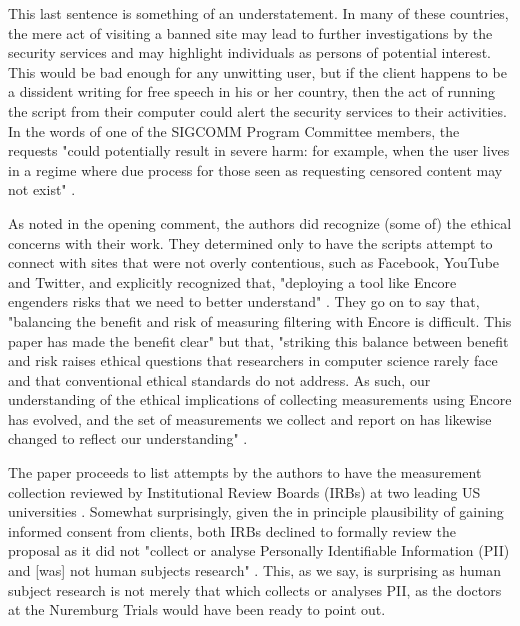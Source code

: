 \documentclass{svjour3}                     %
\begin{document}
This last sentence is something of an understatement.  In many of these countries, the mere act of visiting a banned site may lead to further investigations by the security services and may highlight individuals as persons of potential interest.  This would be bad enough for any unwitting user, but if the client happens to be a dissident writing for free speech in his or her country, then the act of running the script from their computer could alert the security services to their activities. In the words of one of the SIGCOMM Program Committee members, the requests "could potentially result in severe harm: for example, when the user lives in a regime where due process for those seen as requesting censored content may not exist" \cite{byers2015encore}.

As noted in the opening comment, the authors did recognize (some of) the ethical concerns with their work.  They determined only to have the scripts attempt to connect with sites that were not overly contentious, such as Facebook, YouTube and Twitter, and explicitly recognized that, "deploying a tool like Encore engenders risks that we need to better understand" \cite[p.~663] {burnett2015encore}. They go on to say that, "balancing the benefit and risk of measuring filtering with Encore is difficult. This paper has made the benefit clear" but that, "striking this balance between benefit and risk raises ethical questions that researchers in computer science rarely face and that conventional ethical standards do not address. As such, our understanding of the ethical implications of collecting measurements using Encore has evolved, and the set of measurements we collect and report on has likewise changed to reflect our understanding" \cite[p.~663] {burnett2015encore}.

The paper proceeds to list attempts by the authors to have the measurement collection reviewed by Institutional Review Boards (IRBs) at two leading US universities \cite[Table 2,~p.~662] {burnett2015encore}. Somewhat surprisingly, given the in principle plausibility of gaining informed consent from clients, both IRBs declined to formally review the proposal as it did not "collect or analyse Personally Identifiable Information (PII) and [was] not human subjects research" \cite[p.~664]{burnett2015encore}. This, as we say, is surprising as human subject research is not merely that which collects or analyses PII, as the doctors at the Nuremburg Trials would have been ready to point out.
\end{document}
